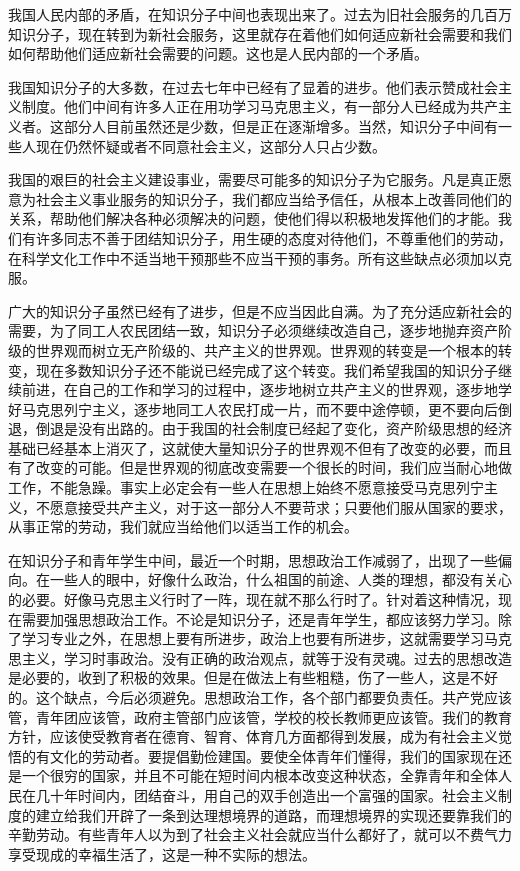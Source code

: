 我国人民内部的矛盾，在知识分子中间也表现出来了。过去为旧社会服务的几百万知识分子，现在转到为新社会服务，这里就存在着他们如何适应新社会需要和我们如何帮助他们适应新社会需要的问题。这也是人民内部的一个矛盾。

我国知识分子的大多数，在过去七年中已经有了显着的进步。他们表示赞成社会主义制度。他们中间有许多人正在用功学习马克思主义，有一部分人已经成为共产主义者。这部分人目前虽然还是少数，但是正在逐渐增多。当然，知识分子中间有一些人现在仍然怀疑或者不同意社会主义，这部分人只占少数。

我国的艰巨的社会主义建设事业，需要尽可能多的知识分子为它服务。凡是真正愿意为社会主义事业服务的知识分子，我们都应当给予信任，从根本上改善同他们的关系，帮助他们解决各种必须解决的问题，使他们得以积极地发挥他们的才能。我们有许多同志不善于团结知识分子，用生硬的态度对待他们，不尊重他们的劳动，在科学文化工作中不适当地干预那些不应当干预的事务。所有这些缺点必须加以克服。

广大的知识分子虽然已经有了进步，但是不应当因此自满。为了充分适应新社会的需要，为了同工人农民团结一致，知识分子必须继续改造自己，逐步地抛弃资产阶级的世界观而树立无产阶级的、共产主义的世界观。世界观的转变是一个根本的转变，现在多数知识分子还不能说已经完成了这个转变。我们希望我国的知识分子继续前进，在自己的工作和学习的过程中，逐步地树立共产主义的世界观，逐步地学好马克思列宁主义，逐步地同工人农民打成一片，而不要中途停顿，更不要向后倒退，倒退是没有出路的。由于我国的社会制度已经起了变化，资产阶级思想的经济基础已经基本上消灭了，这就使大量知识分子的世界观不但有了改变的必要，而且有了改变的可能。但是世界观的彻底改变需要一个很长的时间，我们应当耐心地做工作，不能急躁。事实上必定会有一些人在思想上始终不愿意接受马克思列宁主义，不愿意接受共产主义，对于这一部分人不要苛求；只要他们服从国家的要求，从事正常的劳动，我们就应当给他们以适当工作的机会。

在知识分子和青年学生中间，最近一个时期，思想政治工作减弱了，出现了一些偏向。在一些人的眼中，好像什么政治，什么祖国的前途、人类的理想，都没有关心的必要。好像马克思主义行时了一阵，现在就不那么行时了。针对着这种情况，现在需要加强思想政治工作。不论是知识分子，还是青年学生，都应该努力学习。除了学习专业之外，在思想上要有所进步，政治上也要有所进步，这就需要学习马克思主义，学习时事政治。没有正确的政治观点，就等于没有灵魂。过去的思想改造是必要的，收到了积极的效果。但是在做法上有些粗糙，伤了一些人，这是不好的。这个缺点，今后必须避免。思想政治工作，各个部门都要负责任。共产党应该管，青年团应该管，政府主管部门应该管，学校的校长教师更应该管。我们的教育方针，应该使受教育者在德育、智育、体育几方面都得到发展，成为有社会主义觉悟的有文化的劳动者。要提倡勤俭建国。要使全体青年们懂得，我们的国家现在还是一个很穷的国家，并且不可能在短时间内根本改变这种状态，全靠青年和全体人民在几十年时间内，团结奋斗，用自己的双手创造出一个富强的国家。社会主义制度的建立给我们开辟了一条到达理想境界的道路，而理想境界的实现还要靠我们的辛勤劳动。有些青年人以为到了社会主义社会就应当什么都好了，就可以不费气力享受现成的幸福生活了，这是一种不实际的想法。

